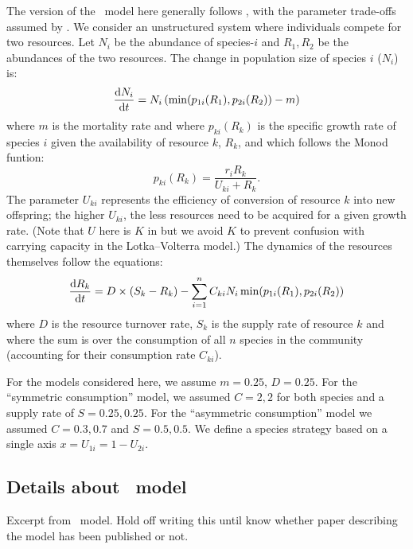 \documentclass[a4paper,11pt]{article}
\begin{document}
The version of the \Rstar\ model here generally follows
\citet{Huisman-2001}, with the parameter trade-offs assumed by
\citet{Fox-2008}.
%
We consider an unstructured system where individuals compete for two resources. Let $N_i$ be the abundance of species-$i$ and $R_1, R_2$ be the abundances of the two resources.
%
The change in population size of species $i$ ($N_i$) is:
\begin{equation}
  \label{eq:rstar-n}
  \frac{\mathrm{d} N_i}{\mathrm{d} t} = N_i \, (\min(p_{1i}(R_1), p_{2i}(R_2)) - m)
\end{equation}
where $m$ is the mortality rate and where $p_{ki}(R_k)$ is the specific growth rate of species $i$ given the availability of resource
$k$, $R_k$, and which follows the Monod funtion:
\begin{equation}
  \label{eq:rstar-p}
  p_{ki}(R_k) = \frac{r_i R_k}{U_{ki} + R_k}.
\end{equation}
%
The parameter $U_{ki}$ represents the efficiency of conversion of resource $k$ into new offspring; the higher $U_{ki}$, the less resources need to be acquired for a given growth rate.  (Note that $U$
here is $K$ in \citealt{Huisman-2001} but we avoid $K$ to prevent confusion with carrying capacity in the Lotka--Volterra model.)
%
The dynamics of the resources themselves follow the equations:
\begin{equation}
  \label{eq:rstar-r}
  \frac{\mathrm{d} R_k}{\mathrm{d} t} =
  D \times (S_k - R_k) - \sum_{i=1}^n {C_{ki} N_i
    \min(p_{1i}(R_1), p_{2i}(R_2))}
\end{equation}
where $D$ is the resource turnover rate, $S_k$ is the supply rate of resource $k$ and where the sum is over the consumption of all $n$ species in the community (accounting for their consumption rate $C_{ki}$).



For the models considered here, we assume $m = 0.25$, $D=0.25$.
%
For the ``symmetric consumption'' model, we assumed $C = {2, 2}$
for both species and a supply rate of  $S = {0.25, 0.25}$.  For the
``asymmetric consumption'' model we assumed $C = {0.3, 0.7}$ and
$S = {0.5, 0.5}$.  We define a species strategy based on a single axis
$x = U_{1i} = 1 - U_{2i}$.


\subsection{Details about \plant\ model}\label{sec:plant}

Excerpt from  \plant\ model. Hold off writing this until know whether paper describing the model has been published or not.
\end{document}
